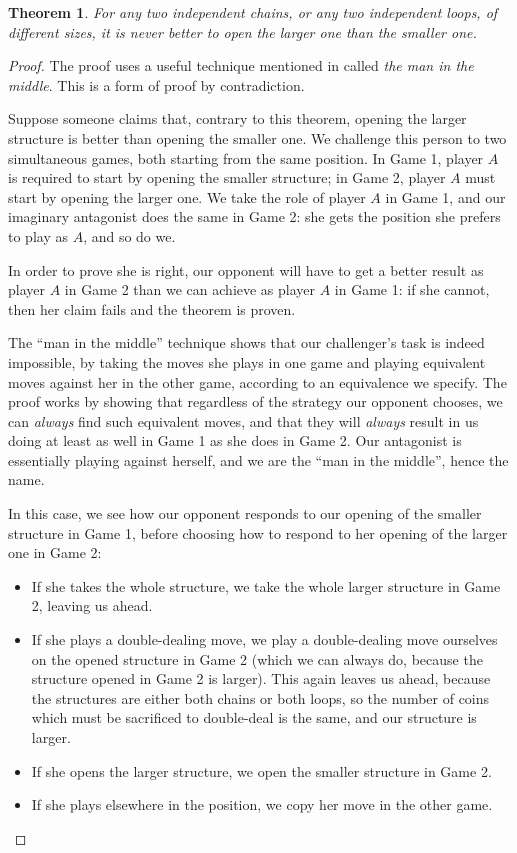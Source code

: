 \documentclass[a4paper,twocolumn]{article}
\newtheorem{opensmallest}[thm]{Theorem}
\begin{document}
\begin{opensmallest}\label{opensmallest}
  For any two independent chains, or any two independent loops, of
  different sizes, it is never better to open the larger one than the
  smaller one.
\end{opensmallest}
\begin{proof}
  The proof uses a useful technique mentioned in \cite{berl} called
  \emph{the man in the middle}. This is a form of proof by
  contradiction.

  Suppose someone claims that, contrary to this theorem, opening the
  larger structure is better than opening the smaller one. We
  challenge this person to two simultaneous games, both starting from
  the same position. In Game 1, player $A$ is required to start by
  opening the smaller structure; in Game 2, player $A$ must start by
  opening the larger one. We take the role of player $A$ in Game 1,
  and our imaginary antagonist does the same in Game 2: she gets the
  position she prefers to play as $A$, and so do we.

  In order to prove she is right, our opponent will have to get a
  better result as player $A$ in Game 2 than we can achieve as player
  $A$ in Game 1: if she cannot, then her claim fails and the theorem
  is proven.

  The ``man in the middle'' technique shows that our challenger's task
  is indeed impossible, by taking the moves she plays in one game and
  playing equivalent moves against her in the other game, according to
  an equivalence we specify. The proof works by showing that
  regardless of the strategy our opponent chooses, we can
  \emph{always} find such equivalent moves, and that they will
  \emph{always} result in us doing at least as well in Game 1 as she
  does in Game 2. Our antagonist is essentially playing against
  herself, and we are the ``man in the middle'', hence the name.

  In this case, we see how our opponent responds to our opening of the
  smaller structure in Game 1, before choosing how to respond to her
  opening of the larger one in Game 2:

  \begin{itemize}
  \item If she takes the whole structure, we take the whole larger
    structure in Game 2, leaving us ahead.
  \item If she plays a double-dealing move, we play a double-dealing
    move ourselves on the opened structure in Game 2 (which we can
    always do, because the structure opened in Game 2 is larger). This
    again leaves us ahead, because the structures are either both
    chains or both loops, so the number of coins which must be
    sacrificed to double-deal is the same, and our structure is
    larger.
  \item If she opens the larger structure, we open the smaller
    structure in Game 2.
  \item If she plays elsewhere in the position, we copy her move in
    the other game.
  \end{itemize}


\end{proof}
\end{document}
